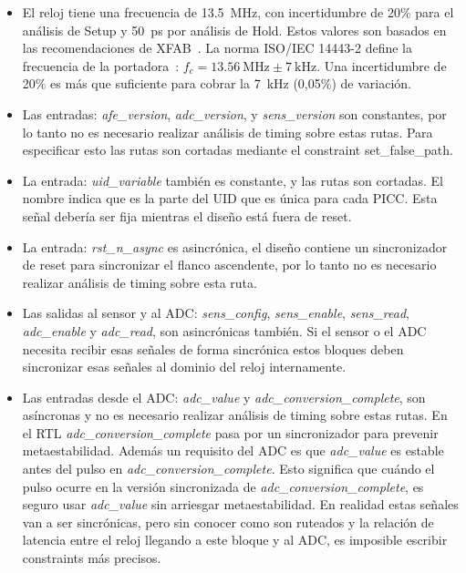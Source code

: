 \documentclass[a4paper, twoside, 11pt]{report}
\begin{document}
\begin{itemize}
  \item El reloj tiene una frecuencia de \SI{13.5}{\mega\hertz}, con incertidumbre de 20\% para el análisis de Setup y \SI{50}{\pico\second} por análisis de Hold. Estos valores son basados en las recomendaciones de XFAB~\cite{dig_imp_guidelines}. La norma ISO/IEC 14443-2 define la frecuencia de la portadora~\cite{iso14443-2}: $f_c = \SI{13.56}{\mega\hertz} \pm \SI{7}{\kilo\hertz}$. Una incertidumbre de 20\% es más que suficiente para cobrar la \SI{7}{\kilo\hertz} (0,05\%) de variación.
  \item Las entradas: \textit{afe\_version}, \textit{adc\_version}, y \textit{sens\_version} son constantes, por lo tanto no es necesario realizar análisis de timing sobre estas rutas. Para especificar esto las rutas son cortadas mediante el constraint set\_false\_path.
  \item La entrada: \textit{uid\_variable} también es constante, y las rutas son cortadas. El nombre indica que es la parte del UID que es única para cada PICC. Esta señal debería ser fija mientras el diseño está fuera de reset.
  \item La entrada: \textit{rst\_n\_async} es asincrónica, el diseño contiene un sincronizador de reset para sincronizar el flanco ascendente, por lo tanto no es necesario realizar análisis de timing sobre esta ruta.
  \item Las salidas al sensor y al ADC: \textit{sens\_config}, \textit{sens\_enable}, \textit{sens\_read}, \textit{adc\_enable} y \textit{adc\_read}, son asincrónicas también. Si el sensor o el ADC necesita recibir esas señales de forma sincrónica estos bloques deben sincronizar esas señales al dominio del reloj internamente.
  \item Las entradas desde el ADC: \textit{adc\_value} y \textit{adc\_conversion\_complete}, son asíncronas y no es necesario realizar análisis de timing sobre estas rutas. En el RTL \textit{adc\_conversion\_complete} pasa por un sincronizador para prevenir metaestabilidad. Además un requisito del ADC es que \textit{adc\_value} es estable antes del pulso en \textit{adc\_conversion\_complete}. Esto significa que cuándo el pulso ocurre en la versión sincronizada de \textit{adc\_conversion\_complete}, es seguro usar \textit{adc\_value} sin arriesgar metaestabilidad. En realidad estas señales van a ser sincrónicas, pero sin conocer como son ruteados y la relación de latencia entre el reloj llegando a este bloque y al ADC, es imposible escribir constraints más precisos.

\end{itemize}
\end{document}
